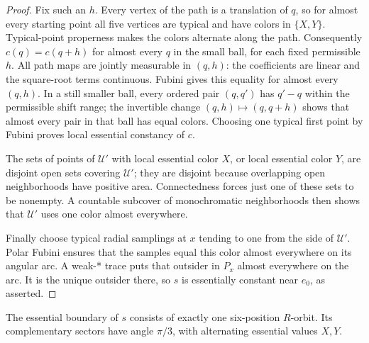 \begin{proof}
Fix such an \(h\).  Every vertex of the path is a translation
of \(q\), so for almost every starting point all five vertices
are typical and have colors in \(\{X,Y\}\).  Typical-point
properness makes the colors alternate along the path.
Consequently \(c(q)=c(q+h)\) for almost every \(q\) in
the small ball, for each fixed permissible \(h\).
All path maps are jointly measurable in \((q,h)\): the
coefficients are linear and the square-root terms continuous.
Fubini gives this equality for almost every \((q,h)\).
In a still smaller ball, every ordered pair \((q,q')\)
has \(q'-q\) within the permissible shift range; the
invertible change \((q,h)\mapsto(q,q+h)\) shows that
almost every pair in that ball has equal colors.  Choosing
one typical first point by Fubini proves local essential
constancy of \(c\).

The sets of points of \(\mathcal U'\) with local essential
color \(X\), or local essential color \(Y\), are disjoint
open sets covering \(\mathcal U'\); they are disjoint because
overlapping open neighborhoods have positive area.
Connectedness forces just one of these sets to be nonempty.
A countable subcover of monochromatic neighborhoods then
shows that \(\mathcal U'\) uses one color almost everywhere.

Finally choose typical radial samplings at \(x\) tending
to one from the side of \(\mathcal U'\).  Polar Fubini
ensures that the samples equal this color almost everywhere
on its angular arc.  A weak-* trace puts that outsider in
\(P_x\) almost everywhere on the arc.  It is the unique
outsider there, so \(s\) is essentially constant near
\(e_0\), as asserted.
\end{proof}

\begin{lemma}\label{lem:angular-boundary}
The essential boundary of \(s\) consists of exactly one
six-position \(R\)-orbit.  Its complementary sectors have
angle \(\pi/3\), with alternating essential values \(X,Y\).
\end{lemma}


